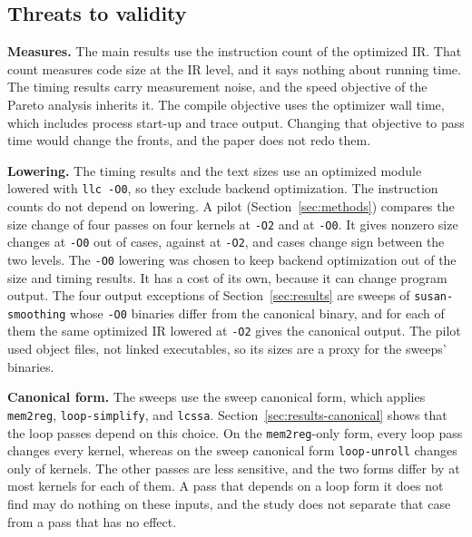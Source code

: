 \subsection{Threats to validity}
\label{sec:threats}

\textbf{Measures.} The main results use the instruction count of the optimized IR. That count measures code size at the IR
level, and it says nothing about running time. The timing results carry measurement noise, and the speed objective of the
Pareto analysis inherits it. The compile objective uses the optimizer wall time, which includes process start-up and trace output.
Changing that objective to pass time would change the fronts, and the paper does not redo them.

\textbf{Lowering.} The timing results and the text sizes use an optimized module lowered with \texttt{llc -O0}, so they exclude backend optimization. The instruction counts do not depend on lowering. A pilot (Section~\ref{sec:methods}) compares the size change of four passes on four kernels at \texttt{-O2} and at \texttt{-O0}. It gives \LoweringPilotNonzeroOZero{} nonzero size changes at \texttt{-O0} out of \LoweringPilotCases{} cases, against \LoweringPilotNonzeroOTwo{} at \texttt{-O2}, and \LoweringPilotSignFlips{} cases change sign between the two levels. The \texttt{-O0} lowering was chosen to keep backend optimization out of the size and timing results. It has a cost of its own, because it can change program output. The four output exceptions of Section~\ref{sec:results} are sweeps of \texttt{susan-smoothing} whose \texttt{-O0} binaries differ from the canonical binary, and for each of them the same optimized IR lowered at \texttt{-O2} gives the canonical output. The pilot used object files, not linked executables, so its sizes are a proxy for the sweeps' binaries.

\textbf{Canonical form.} The sweeps use the sweep canonical form, which applies \texttt{mem2reg}, \texttt{loop-simplify}, and \texttt{lcssa}. Section~\ref{sec:results-canonical} shows that the loop passes depend on this choice. On the \texttt{mem2reg}-only form, every loop pass changes every kernel, whereas on the sweep canonical form \texttt{loop-unroll} changes only \PassChecksUnrollCanonicalChanged{} of \PassChecksKernels{} kernels. The other passes are less sensitive, and the two forms differ by at most \PassChecksOtherMaxDiff{} kernels for each of them. A pass that depends on a loop form it does not find may do nothing on these inputs, and the study does not separate that case from a pass that has no effect.

